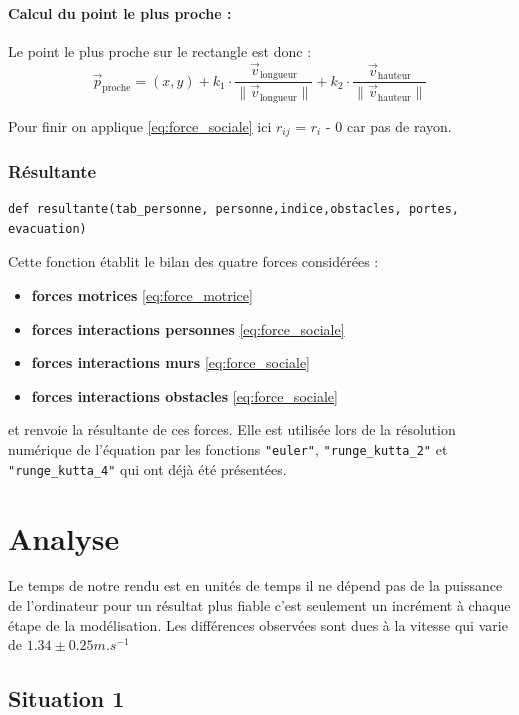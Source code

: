 \documentclass[a4paper,12pt]{article}
\begin{document}
\paragraph{Calcul du point le plus proche :}

Le point le plus proche sur le rectangle est donc :
\[
\vec{p}_{\text{proche}} = (x, y) + k_1 \cdot \frac{\vec{v}_{\text{longueur}}}{\|\vec{v}_{\text{longueur}}\|} + k_2 \cdot \frac{\vec{v}_{\text{hauteur}}}{\|\vec{v}_{\text{hauteur}}\|}
\]

Pour finir on applique \eqref{eq:force_sociale} ici $r_{ij}$ = $r_i$ - 0 car pas de rayon.

\subsubsection{Résultante}

\begin{verbatim}
def resultante(tab_personne, personne,indice,obstacles, portes, evacuation)
\end{verbatim}

Cette fonction établit le bilan des quatre forces considérées :
\begin{itemize}
	\item \textbf{forces motrices} \eqref{eq:force_motrice}
	\item \textbf{forces interactions personnes} \eqref{eq:force_sociale}
	\item \textbf{forces interactions murs} \eqref{eq:force_sociale}
 	\item \textbf{forces interactions obstacles} \eqref{eq:force_sociale}
\end{itemize}
et renvoie la résultante de ces forces. Elle est utilisée lors de la résolution numérique de l'équation par les fonctions \texttt{"euler"}, \texttt{"runge\_kutta\_2"} et \texttt{"runge\_kutta\_4"} qui ont déjà été présentées.

\section{Analyse}
Le temps de notre rendu est en unités de temps il ne dépend pas de la puissance de l'ordinateur pour un résultat plus fiable c'est seulement un incrément à chaque étape de la modélisation. Les différences observées sont dues à la vitesse qui varie de $1.34 \pm 0.25 m.s^{-1}$
\subsection{Situation 1}
\end{document}
